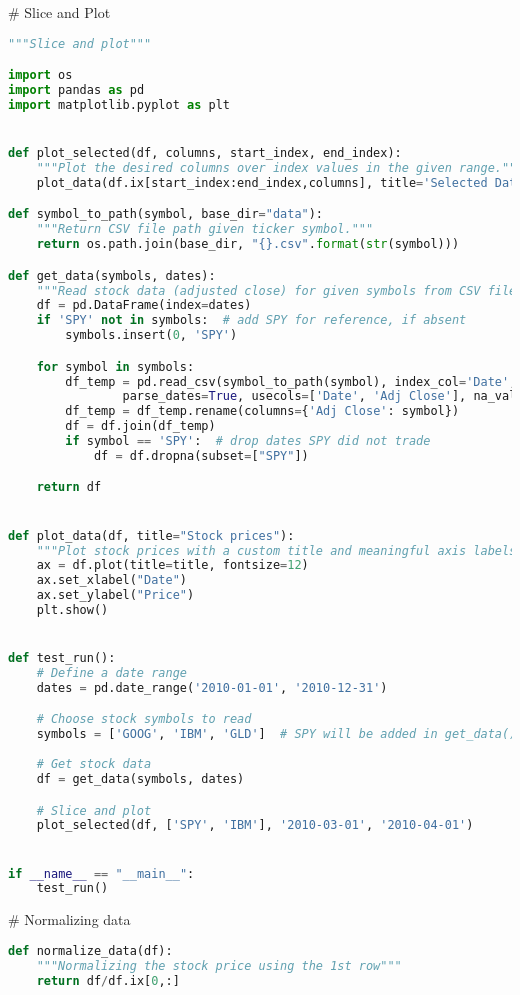 \documentclass{article}
\begin{document}
\# Slice and Plot
\begin{lstlisting}[language=Python]
"""Slice and plot"""

import os
import pandas as pd
import matplotlib.pyplot as plt


def plot_selected(df, columns, start_index, end_index):
    """Plot the desired columns over index values in the given range."""
    plot_data(df.ix[start_index:end_index,columns], title='Selected Data')

def symbol_to_path(symbol, base_dir="data"):
    """Return CSV file path given ticker symbol."""
    return os.path.join(base_dir, "{}.csv".format(str(symbol)))

def get_data(symbols, dates):
    """Read stock data (adjusted close) for given symbols from CSV files."""
    df = pd.DataFrame(index=dates)
    if 'SPY' not in symbols:  # add SPY for reference, if absent
        symbols.insert(0, 'SPY')

    for symbol in symbols:
        df_temp = pd.read_csv(symbol_to_path(symbol), index_col='Date',
                parse_dates=True, usecols=['Date', 'Adj Close'], na_values=['nan'])
        df_temp = df_temp.rename(columns={'Adj Close': symbol})
        df = df.join(df_temp)
        if symbol == 'SPY':  # drop dates SPY did not trade
            df = df.dropna(subset=["SPY"])

    return df


def plot_data(df, title="Stock prices"):
    """Plot stock prices with a custom title and meaningful axis labels."""
    ax = df.plot(title=title, fontsize=12)
    ax.set_xlabel("Date")
    ax.set_ylabel("Price")
    plt.show()


def test_run():
    # Define a date range
    dates = pd.date_range('2010-01-01', '2010-12-31')

    # Choose stock symbols to read
    symbols = ['GOOG', 'IBM', 'GLD']  # SPY will be added in get_data()
    
    # Get stock data
    df = get_data(symbols, dates)

    # Slice and plot
    plot_selected(df, ['SPY', 'IBM'], '2010-03-01', '2010-04-01')


if __name__ == "__main__":
    test_run()
\end{lstlisting}

\# Normalizing data
\begin{lstlisting}[language=Python]
def normalize_data(df):
    """Normalizing the stock price using the 1st row"""
    return df/df.ix[0,:]
\end{lstlisting}
\end{document}
